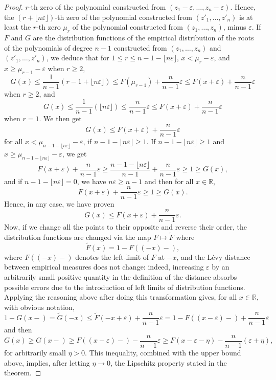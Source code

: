\documentclass[10pt,a4paper]{amsart}
\begin{document}
\begin{proof}
$r$-th zero of the polynomial constructed from 
$(z_1- \varepsilon, \dots, z_n - \varepsilon)$. Hence, the 
$(r + \lfloor n \varepsilon \rfloor)$-th zero of the polynomial constructed from $(z'_1, \dots, z'_n)$ is at least the $r$-th zero $\mu_r$ of the 
polynomial constructed from $(z_1, \dots, z_n)$, minus $\varepsilon$. 
If $F$ and $G$ are the distribution functions of the empirical distribution of the roots of the polynomials of degree $n-1$ constructed from 
$(z_1, \dots, z_n)$ and $(z'_1, \dots, z'_n)$, we deduce that for $1 \leq r \leq n - 1 - \lfloor n \varepsilon \rfloor$,  
$x < \mu_r - \varepsilon$, 
and $x \geq  \mu_{r-1} - \varepsilon$ when $r \geq 2$, 
$$G(x) \leq \frac{1}{n-1} (r - 1 + \lfloor n \varepsilon \rfloor) \leq F(\mu_{r-1})   + \frac{n}{n-1} \varepsilon  \leq F(x + \varepsilon) +  \frac{n}{n-1} \varepsilon 
$$
when $r \geq 2$, and 
$$G(x) \leq \frac{1}{n-1} (\lfloor n \varepsilon \rfloor) \leq   \frac{n}{n-1} \varepsilon  \leq F(x + \varepsilon) +  \frac{n}{n-1} \varepsilon 
$$
when $r = 1$. 
We then get 
$$G(x) \leq  F(x + \varepsilon) +  \frac{n}{n-1} \varepsilon $$
for all $x < \mu_{n- 1 - \lfloor n \varepsilon \rfloor} - \varepsilon$, if $n- 1 - \lfloor n \varepsilon \rfloor \geq 1$. 
If $n - 1 -\lfloor n \varepsilon \rfloor \geq 1 $
and $x \geq \mu_{n- 1 - \lfloor n \varepsilon \rfloor}
- \varepsilon$, 
we get 
$$  F(x + \varepsilon) +  \frac{n}{n-1}  \varepsilon
\geq \frac{n - 1 -\lfloor n \varepsilon \rfloor}{n-1}
+ \frac{n}{n-1} \varepsilon \geq 1 \geq G(x),$$
and if $n - 1 - \lfloor n \varepsilon \rfloor = 0$, 
we have $n \varepsilon \geq n-1$ and then for all $x \in \mathbb{R}$, 
$$ F(x + \varepsilon) +  \frac{n}{n-1} \varepsilon
\geq 1 \geq G(x).$$
Hence, in any case, we have proven 
$$G(x) \leq F(x + \varepsilon) + \frac{n}{n-1}  \varepsilon.$$
Now, if we change all the points to their opposite and reverse their order, the distribution functions 
are changed via the map $F \mapsto \widetilde{F}$ where 
$$\widetilde{F} (x) = 1 - F((-x)-),$$
where $F((-x)-)$ denotes the left-limit of $F$ at $-x$,  
and the L\'evy distance between empirical measures does not change: indeed, increasing $\varepsilon$ by an arbitrarily small positive quantity in the definition of the distance absorbs possible errors due to the introduction of left limits of distribution functions. 
Applying the reasoning above after doing this transformation gives, for all $x \in \mathbb{R}$, 
with obvious notation, 
$$1 - G(x-) = \widetilde{G} (-x) \leq \widetilde{F} (-x + \varepsilon) + \frac{n}{n-1} \varepsilon
= 1 - F((x - \varepsilon)-) + \frac{n}{n-1} \varepsilon$$
and then
$$G(x) \geq G(x-) \geq F((x-\varepsilon)-) - \frac{n}{n-1} \varepsilon
\geq F(x-\varepsilon- \eta) - \frac{n}{n-1}
(\varepsilon + \eta),$$
for arbitrarily small $\eta > 0$. 
This inequality, combined with the upper bound above,
implies, after letting $\eta \rightarrow 0$, the Lipschitz property stated in the theorem. 

\end{proof}
\end{document}
